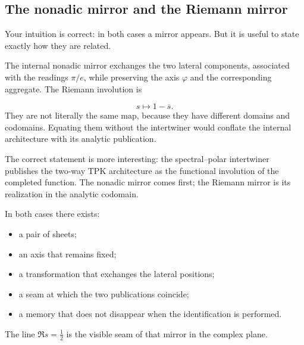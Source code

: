 \subsection{The nonadic mirror and the Riemann mirror}
Your intuition is correct: in both cases a mirror appears. But it is useful to state exactly how they are related.\par
The internal nonadic mirror exchanges the two lateral components, associated with the readings \(\pi/e\), while preserving the axis \(\varphi\) and the corresponding aggregate. The Riemann involution is\par
\[
s\longmapsto1-\overline s.
\]
They are not literally the same map, because they have different domains and codomains. Equating them without the intertwiner would conflate the internal architecture with its analytic publication.\par
The correct statement is more interesting: the spectral--polar intertwiner publishes the two-way TPK architecture as the functional involution of the completed function. The nonadic mirror comes first; the Riemann mirror is its realization in the analytic codomain.\par
In both cases there exists:\par
\begin{itemize}
\item a pair of sheets;
\item an axis that remains fixed;
\item a transformation that exchanges the lateral positions;
\item a seam at which the two publications coincide;
\item a memory that does not disappear when the identification is performed.
\end{itemize}
The line \(\Re s=\tfrac12\) is the visible seam of that mirror in the complex plane.\par
{}
